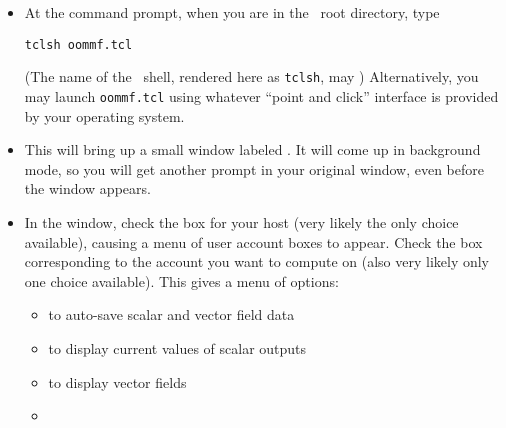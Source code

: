 \begin{list}{}{\setlength{\labelwidth}{0pt}
               \setlength{\leftmargin}{0pt}
               \setlength{\rightmargin}{\leftmargin}
               \setlength{\itemsep}{0pt}}
  \item {}
  \begin{itemize}
    \item At the command prompt, when you are in the \OOMMF\ root
          directory, type 
\begin{verbatim}
tclsh oommf.tcl
\end{verbatim}
    (The name of the \Tcl\ shell, rendered here as \verb+tclsh+, may
    )
    Alternatively, you may launch \verb+oommf.tcl+ using
    whatever ``point and click'' interface is provided by your operating
    system.
    \item This will bring up a small window labeled
          . It will come up in background mode, so you will get
          another prompt in your original window, even before the
           window appears.
  \end{itemize}
  \item {}
  \begin{itemize}
    \item In the  window, check the box for your host
	  (very likely the only choice available),
          causing a menu of user account boxes to appear.  Check
          the box corresponding to the account you want to compute on
	  (also very likely only one choice available).
          This gives a menu of options:
    \begin{itemize}
       \item {}
                   to auto-save scalar and vector field data
       \item {}
                   to display current values of scalar outputs
       \item {}
                   to display vector fields
       \item {}

\end{itemize}
\end{itemize}
\end{list}
